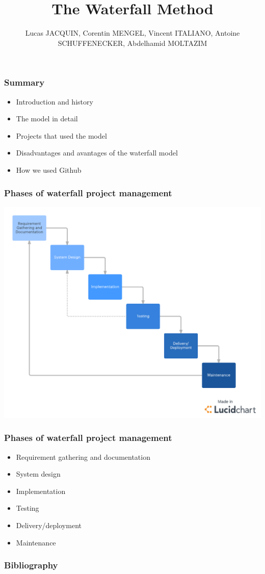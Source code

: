 \documentclass[handout]{beamer}
\title{The Waterfall Method}
\author{Lucas JACQUIN, Corentin MENGEL, Vincent ITALIANO, Antoine SCHUFFENECKER, Abdelhamid MOLTAZIM}
\begin{document}
\begin{frame}    
    
    \maketitle

\end{frame}

\begin{frame}
    
    \frametitle{Summary}
    \begin{itemize}
        \setlength\itemsep{1em}
        \item Introduction and history \pause
        \item The model in detail \pause
        \item Projects that used the model \pause
        \item Disadvantages and avantages of the waterfall model \pause
        \item How we used Github 
    \end{itemize}
\end{frame}

\begin{frame}
    \frametitle{Phases of waterfall project management}
    \includegraphics[scale=0.25]{Images/WaterfallDiagram.png}
\end{frame}

\begin{frame}
    \frametitle{Phases of waterfall project management}
    \begin{itemize}
        \setlength\itemsep{1em}
        \item Requirement gathering and documentation \pause
        \item System design \pause
        \item Implementation \pause
        \item Testing \pause
        \item Delivery/deployment \pause
        \item Maintenance
    \end{itemize}
\end{frame}


\nocite{*}
\begin{frame}
    \frametitle{Bibliography}

    
        

\end{frame}
\end{document}

